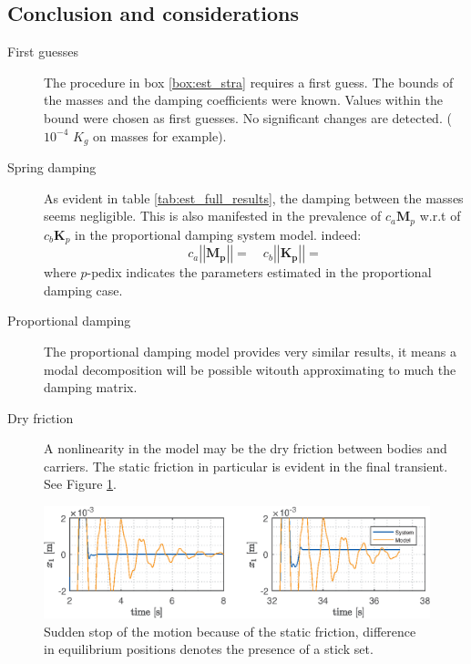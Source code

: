 \documentclass[twosided,a4paper]{article}           %
\newcommand{\norm}[1]{\left \lvert \left \lvert #1 \right \rvert \right  \rvert}
\newcommand{\rs}[1]{}
\newcounter{box}
\begin{document}
\subsection{Conclusion and considerations}
\begin{description}
	\item[First guesses] The procedure in box \ref{box:est_stra} requires a first guess. The bounds of the masses and the damping coefficients were known. Values within the bound were chosen as first guesses. No significant changes are detected. ($10^{-4}$ $K_g$ on masses for example).
	\item[Spring damping] As evident in table \ref{tab:est_full_results}, the damping between the masses seems negligible. This is also manifested in the prevalence of $c_a\bm{M}_p$ w.r.t of $c_b\bm{K}_p$ in the proportional damping system model. indeed:
	\begin{equation}
	c_a	\norm{\bm{M_p}} = \rs{c_a_m} \quad c_b	\norm{\bm{K_p}} = \rs{c_b_k}
	\end{equation}
	where $p$-pedix indicates the parameters estimated in the proportional damping case.
	\item[Proportional damping] The proportional damping model provides very similar results, it means a modal decomposition will be possible witouth approximating to much the damping matrix.
	\item[Dry friction] A nonlinearity in the model may be the dry friction between bodies and carriers. The static friction in particular is evident in the final transient. See Figure \ref{fig:dryfric}.
\end{description}
\begin{figure}[H]
	\centering
	\includegraphics[width=.8\linewidth]{img/dry_fric}
	\caption{Sudden stop of the motion because of the static friction, difference in equilibrium positions denotes the presence of a stick set.}
	\label{fig:dryfric}
\end{figure}
\end{document}
